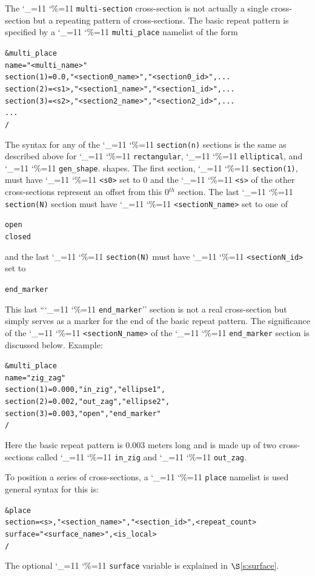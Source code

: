 \documentclass[11pt,openany]{report}
\newcommand{\sref}[1]{$\S$\ref{#1}}
\newcommand\ttcmd{\begingroup\catcode`\_=11 \catcode`\%=11 \dottcmd}
\newcommand\dottcmd[1]{\texttt{#1}\endgroup}
\newcommand{\vn}{\ttcmd}
\newcommand{\Th}{$^{th}$\xspace}
\newlength{\ExBeg}
\newlength{\ExEnd}
\newenvironment{example}
  {\vspace{\ExBeg} \begin{alltt}}
  {\end{alltt} \vspace{\ExEnd}}
\begin{document}
The \vn{multi-section} cross-section is not actually a single
cross-section but a repeating pattern of cross-sections. The basic
repeat pattern is specified by a \vn{multi_place} namelist of
the form
\begin{example}
  &multi_place
    name = "<multi_name>"
    section(1) = 0.0,  "<section0_name>", "<section0_id>", ...
    section(2) = <s1>, "<section1_name>", "<section1_id>", ...
    section(3) = <s2>, "<section2_name>", "<section2_id>", ...
    ...
  /
\end{example}
The syntax for any of the \vn{section(n)} sections is the same as
described above for \vn{rectangular}, \vn{elliptical}, and \vn{gen_shape}.
shapes. The first section, \vn{section(1)}, must
have \vn{<s0>} set to 0 and the \vn{<s>} of the other cross-sections
represent an offset from this 0\Th section. The last
\vn{section(N)} section must have \vn{<sectionN_name>} set to one of
\begin{example}
  open
  closed
\end{example}
and the last \vn{section(N)} must have \vn{<sectionN_id>} set to
\begin{example}
  end_marker
\end{example}
This last ``\vn{end_marker}'' section is not a real cross-section but
simply serves as a marker for the end of the basic repeat pattern. The
significance of the \vn{<sectionN_name>} of the \vn{end_marker} section is
discussed below. Example:
\begin{example}
  &multi_place
    name = "zig_zag"
    section(1) = 0.000, "in_zig",  "ellipse1",
    section(2) = 0.002, "out_zag", "ellipse2",
    section(3) = 0.003, "open",  "end_marker"
  /
\end{example}
Here the basic repeat pattern is 0.003 meters long and is made up of
two cross-sections called \vn{in_zig} and \vn{out_zag}.

To position a series of cross-sections, a \vn{place} namelist is used
general syntax for this is:
\begin{example}
  &place 
    section = <s>, "<section_name>", "<section_id>", <repeat_count> 
    surface = "<surface_name>", <is_local>
  /
\end{example} 
The optional \vn{surface} variable is explained in \sref{s:surface}.
\end{document}

